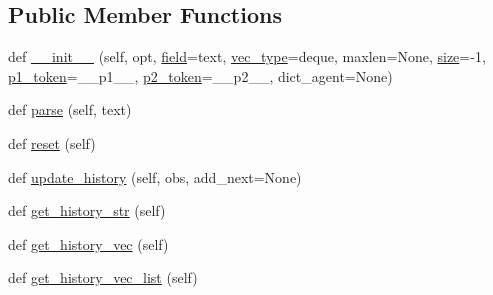 \subsection*{Public Member Functions}
\begin{DoxyCompactItemize}
\item 
def \hyperlink{classparlai_1_1core_1_1torch__agent_1_1History_af2670eff50563dcee5da6581355e758f}{\+\_\+\+\_\+init\+\_\+\+\_\+} (self, opt, \hyperlink{classparlai_1_1core_1_1torch__agent_1_1History_a3481b17d1cd076c5e3ee82178ea7411a}{field}=\textquotesingle{}text\textquotesingle{}, \hyperlink{classparlai_1_1core_1_1torch__agent_1_1History_a7e5b6e0372fa48e0e1ba747b5628bfc7}{vec\+\_\+type}=\textquotesingle{}deque\textquotesingle{}, maxlen=None, \hyperlink{classparlai_1_1core_1_1torch__agent_1_1History_a18b6c863146d30b93d15de840566044b}{size}=-\/1, \hyperlink{classparlai_1_1core_1_1torch__agent_1_1History_a7eff0681e0eee4051abb530797f15884}{p1\+\_\+token}=\textquotesingle{}\+\_\+\+\_\+p1\+\_\+\+\_\+\textquotesingle{}, \hyperlink{classparlai_1_1core_1_1torch__agent_1_1History_ab9f9f10b0dd73d90d3798fb3e1787ee6}{p2\+\_\+token}=\textquotesingle{}\+\_\+\+\_\+p2\+\_\+\+\_\+\textquotesingle{}, dict\+\_\+agent=None)
\item 
def \hyperlink{classparlai_1_1core_1_1torch__agent_1_1History_a7758c7e9d42442ac228b820be4298d84}{parse} (self, text)
\item 
def \hyperlink{classparlai_1_1core_1_1torch__agent_1_1History_a82e02d0b34707b2e00b95bc659411bae}{reset} (self)
\item 
def \hyperlink{classparlai_1_1core_1_1torch__agent_1_1History_ac7bdfbe78c9f6aed1118161bd24a7c8e}{update\+\_\+history} (self, obs, add\+\_\+next=None)
\item 
def \hyperlink{classparlai_1_1core_1_1torch__agent_1_1History_a29576ee0dd27b8ee5e651297dada3131}{get\+\_\+history\+\_\+str} (self)
\item 
def \hyperlink{classparlai_1_1core_1_1torch__agent_1_1History_a0d9c7a847af118f77e9986279acf7dea}{get\+\_\+history\+\_\+vec} (self)
\item 
def \hyperlink{classparlai_1_1core_1_1torch__agent_1_1History_a117862fe92da69172cb8e0c494bcd280}{get\+\_\+history\+\_\+vec\+\_\+list} (self)
\end{DoxyCompactItemize}
